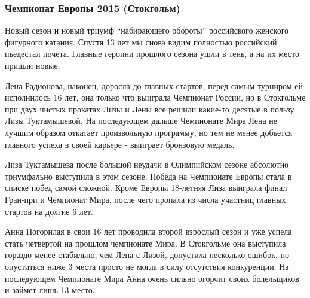 
 
 
 
 
\subsubsection{Чемпионат Европы 2015 (Стокгольм)}

Новый сезон и новый триумф \enquote{набирающего обороты} российского женского фигурного
катания. Спустя 13 лет мы снова видим полностью российский пьедестал почета.
Главные героини прошлого сезона ушли в тень, а на их место пришли новые. 


Лена Радионова, наконец, доросла до главных стартов, перед самым турниром ей
исполнилось 16 лет, она только что выиграла Чемпионат России, но в Стокгольме
при двух чистых прокатах Лизы и Лены все решили какие-то десятые в пользу Лизы
Туктамышевой. На последующем дальше Чемпионате Мира Лена не лучшим образом
откатает произвольную программу, но тем не менее добьется главного успеха в
своей карьере - выиграет бронзовую медаль.


Лиза Туктамышева после большой неудачи в Олимпийском сезоне абсолютно
триумфально выступила в этом сезоне. Победа на Чемпионате Европы стала в списке
побед самой сложной. Кроме Европы 18-летняя Лиза выиграла финал Гран-при и
Чемпионат Мира, после чего пропала из числа участниц главных стартов на долгие
6 лет.

Анна Погорилая в свои 16 лет проводила второй взрослый сезон и уже успела стать
четвертой на прошлом чемпионате Мира. В Стокгольме она выступила гораздо менее
стабильно, чем Лена с Лизой, допустила несколько ошибок, но опуститься ниже 3
места просто не могла в силу отсутствия конкуренции. На последующем Чемпионате
Мира Анна очень сильно огорчит своих болельщиков и займет лишь 13 место.
